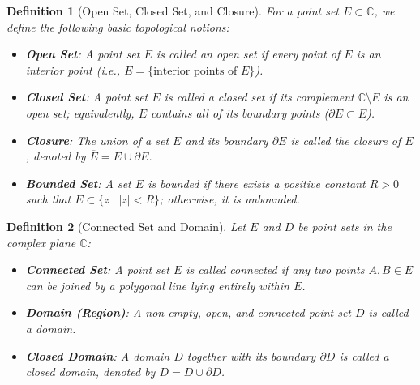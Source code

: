 \documentclass[11pt,a4paper]{article}
\theoremstyle{definitionbreak}
\newtheorem{definition}{Definition}
\theoremstyle{examplebreak}
\theoremstyle{plain}
\begin{document}
\begin{definition}[Open Set, Closed Set, and Closure]
For a point set $E \subset \mathbb{C}$, we define the following basic topological notions:
\begin{itemize}
    \item \textbf{Open Set}: A point set $E$ is called an open set if every point of $E$ is an interior point (i.e., $E = \{ \text{interior points of } E \}$).
    \item \textbf{Closed Set}: A point set $E$ is called a closed set if its complement $\mathbb{C} \setminus E$ is an open set; equivalently, $E$ contains all of its boundary points ($\partial E \subset E$).
    \item \textbf{Closure}: The union of a set $E$ and its boundary $\partial E$ is called the closure of $E$, denoted by $\overline{E} = E \cup \partial E$.
    \item \textbf{Bounded Set}: A set $E$ is bounded if there exists a positive constant $R > 0$ such that $E \subset \{z \mid |z| < R\}$; otherwise, it is unbounded.
\end{itemize}
\end{definition}

\begin{definition}[Connected Set and Domain]
Let $E$ and $D$ be point sets in the complex plane $\mathbb{C}$:
\begin{itemize}
    \item \textbf{Connected Set}: A point set $E$ is called connected if any two points $A, B \in E$ can be joined by a polygonal line lying entirely within $E$.
    \item \textbf{Domain (Region)}: A non-empty, open, and connected point set $D$ is called a domain.
    \item \textbf{Closed Domain}: A domain $D$ together with its boundary $\partial D$ is called a closed domain, denoted by $\overline{D} = D \cup \partial D$.
\end{itemize}
\end{definition}
\end{document}

